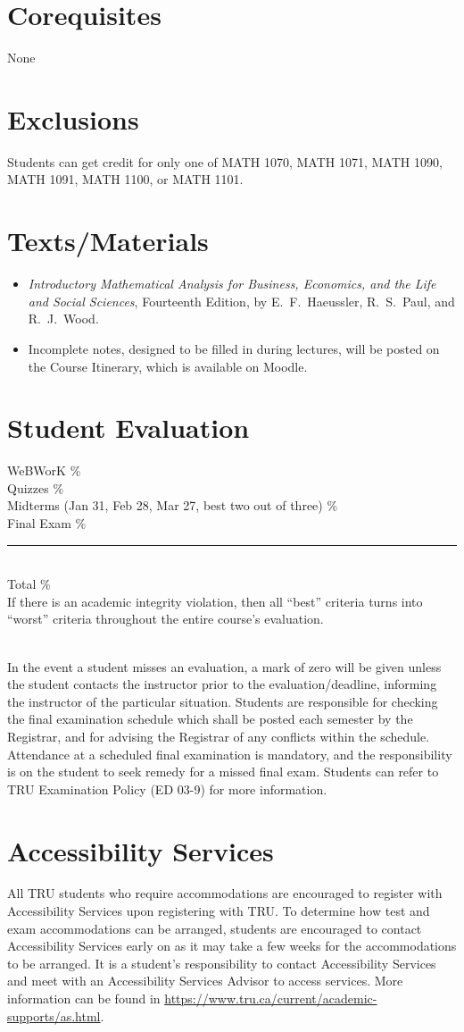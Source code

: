 \documentclass[10pt]{trumathoutline}
\newcommand{\coursecorequisites}{None}
\newcommand{\courseexclusions}{Students can get credit for only one of MATH 1070, MATH 1071, MATH 1090, MATH 1091, MATH 1100, or MATH 1101.}
\newcommand{\textsmaterials}{
\begin{itemize}
\item \emph{Introductory Mathematical Analysis for Business, Economics, and the Life and Social Sciences}, Fourteenth Edition, by E.~F.~Haeussler, R.~S.~Paul, and R.~J.~Wood.
\item Incomplete notes, designed to be filled in during lectures, will be posted on the Course Itinerary, which is available on Moodle.
\end{itemize}
}
\newcommand{\evaluation}{
	WeBWorK		\dotfill	7\%\\
	Quizzes		\dotfill 	18\%\\
	Midterms (Jan 31, Feb 28, Mar 27, best two out of three)		\dotfill	35\%\\
	Final Exam 	\dotfill	40\%\\

	\hrule~\\
	Total 		\dotfill 	100\%\\
	
	If there is an academic integrity violation, then all “best” criteria turns into “worst” criteria throughout the entire course’s evaluation.
}
\begin{document}
\section*{Corequisites}
\coursecorequisites

\section*{Exclusions}
\courseexclusions

\section*{Texts/Materials}
\textsmaterials

\section*{Student Evaluation}
\begin{minipage}{\textwidth}
\evaluation
\end{minipage}\\


In the event a student misses an evaluation, a mark of zero will be given unless the student contacts the instructor prior to the evaluation/deadline, informing the instructor of the particular situation. Students are responsible for checking the final examination schedule which shall be posted each semester by the Registrar, and for advising the Registrar of any conflicts within the schedule. Attendance at a scheduled final examination is mandatory, and the responsibility is on the student to seek remedy for a missed final exam. Students can refer to TRU Examination Policy (ED 03-9) for more information.


\section*{Accessibility Services}
All TRU students who require accommodations are encouraged to register with Accessibility Services upon registering with TRU. To determine how test and exam accommodations can be arranged, students are encouraged to contact Accessibility Services early on as it may take a few weeks for the accommodations to be arranged. It is a student's responsibility to contact Accessibility Services and meet with an Accessibility Services Advisor to access services. More information can be found in
\href{https://www.tru.ca/current/academic-supports/as.html}{https://www.tru.ca/current/academic-supports/as.html}.
\end{document}
